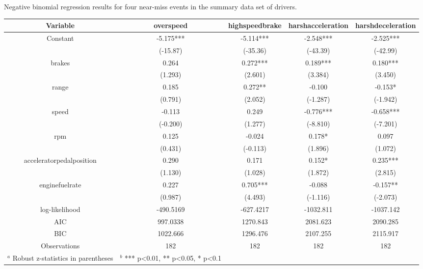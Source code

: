 \documentclass[entropy,article,submit,moreauthors,LaTeX and dvi2pdf]{Definitions/mdpi}
\begin{document}
\begin{specialtable}[htbp]
\widetable
\caption{Negative binomial regression results for four near-miss events in the summary data set of drivers.}
\label{summary-nb}
\begin{tabular}{ccccc}
\toprule
Variable                 & overspeed & highspeedbrake & harshacceleration & harshdeceleration \\
\midrule
Constant                 & -5.175*** & -5.114***      & -2.548***         & -2.525***         \\
                         & (-15.87)  & (-35.36)       & (-43.39)          & (-42.99)          \\
brakes                   & 0.264  & 0.272***    & 0.189***       & 0.180***       \\
                         & (1.293)   & (2.601)        & (3.384)           & (3.450)           \\
range                    & 0.185    & 0.272**       & -0.100           & -0.153*          \\
                         & (0.791)   & (2.052)        & (-1.287)          & (-1.942)          \\
speed                    & -0.113  & 0.249         & -0.776***        & -0.658***        \\
                         & (-0.200)  & (1.277)        & (-8.810)          & (-7.201)          \\
rpm                      & 0.125  & -0.024      & 0.178*         & 0.097          \\
                         & (0.431)   & (-0.113)       & (1.896)           & (1.072)           \\
acceleratorpedalposition & 0.290    & 0.171         & 0.152*           & 0.235***         \\
                         & (1.130)   & (1.028)        & (1.872)           & (2.815)           \\
enginefuelrate           & 0.227    & 0.705***       & -0.088           & -0.157**         \\
                         & (0.987)   & (4.493)        & (-1.116)          & (-2.073)          \\
log-likelihood     & -490.5169 & -627.4217      & -1032.811         & -1037.142         \\
AIC                      & 997.0338  & 1270.843       & 2081.623          & 2090.285          \\
BIC                      & 1022.666  & 1296.476       & 2107.255          & 2115.917          \\
Observations             & 182       & 182            & 182               & 182\\
\bottomrule
\footnotesize{$^a$ Robust z-statistics in parentheses}&
\footnotesize{$^b$  *** p<0.01, ** p<0.05, * p<0.1}
\end{tabular}
\end{specialtable}
\end{document}
